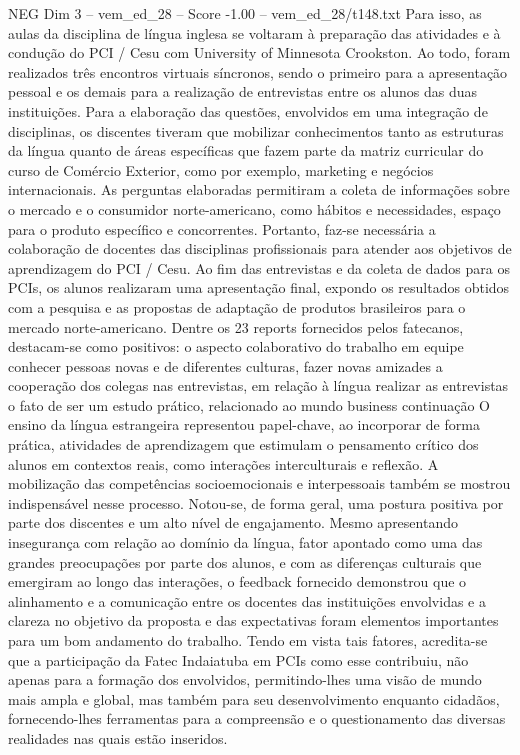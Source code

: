 \begin{textsample}{NEG Dim 3 – vem\_ed\_28 – Score -1.00 – vem\_ed\_28/t148.txt}
Para isso, as aulas da disciplina de língua inglesa se voltaram à preparação das atividades e à condução do PCI / Cesu com University of Minnesota Crookston.
Ao todo, foram realizados três encontros virtuais síncronos, sendo o primeiro para a apresentação pessoal e os demais para a realização de entrevistas entre os alunos das duas instituições.
Para a elaboração das questões, envolvidos em uma integração de disciplinas, os discentes tiveram que mobilizar conhecimentos tanto as estruturas da língua quanto de áreas específicas que fazem parte da matriz curricular do curso de Comércio Exterior, como por exemplo, marketing e negócios internacionais.
As perguntas elaboradas permitiram a coleta de informações sobre o mercado e o consumidor norte-americano, como hábitos e necessidades, espaço para o produto específico e concorrentes.
Portanto, faz-se necessária a colaboração de docentes das disciplinas profissionais para atender aos objetivos de aprendizagem do PCI / Cesu.
Ao fim das entrevistas e da coleta de dados para os PCIs, os alunos realizaram uma apresentação final, expondo os resultados obtidos com a pesquisa e as propostas de adaptação de produtos brasileiros para o mercado norte-americano.
Dentre os 23 reports fornecidos pelos fatecanos, destacam-se como positivos: o aspecto colaborativo do trabalho em equipe conhecer pessoas novas e de diferentes culturas, fazer novas amizades a cooperação dos colegas nas entrevistas, em relação à língua realizar as entrevistas o fato de ser um estudo prático, relacionado ao mundo business continuação O ensino da língua estrangeira representou papel-chave, ao incorporar de forma prática, atividades de aprendizagem que estimulam o pensamento crítico dos alunos em contextos reais, como interações interculturais e reflexão.
A mobilização das competências socioemocionais e interpessoais também se mostrou indispensável nesse processo.
Notou-se, de forma geral, uma postura positiva por parte dos discentes e um alto nível de engajamento.
Mesmo apresentando insegurança com relação ao domínio da língua, fator apontado como uma das grandes preocupações por parte dos alunos, e com as diferenças culturais que emergiram ao longo das interações, o feedback fornecido demonstrou que o alinhamento e a comunicação entre os docentes das instituições envolvidas e a clareza no objetivo da proposta e das expectativas foram elementos importantes para um bom andamento do trabalho.
Tendo em vista tais fatores, acredita-se que a participação da Fatec Indaiatuba em PCIs como esse contribuiu, não apenas para a formação dos envolvidos, permitindo-lhes uma visão de mundo mais ampla e global, mas também para seu desenvolvimento enquanto cidadãos, fornecendo-lhes ferramentas para a compreensão e o questionamento das diversas realidades nas quais estão inseridos.

\end{textsample}
